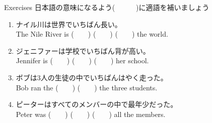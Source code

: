 \documentclass[aspectratio=169,xcolor={dvipsnames,table}]{beamer}
\begin{document}
 \begin{frame}[plain]{Exercises}
日本語の意味になるよう(~~~~~~)に適語を補いましょう%
\hfill{\scriptsize {}}
  \begin{enumerate}
   \item ナイル川は世界でいちばん長い。\\
	 The Nile River is (~~~~) (~~~~) (~~~~) the world.
   \item ジェニファーは学校でいちばん背が高い。\\
	 Jennifer is (~~~~) (~~~~) (~~~~) her school.
   \item ボブは3人の生徒の中でいちばんはやく走った。\\
	 Bob ran the (~~~~) (~~~~) the three students.
   \item ピーターはすべてのメンバーの中で最年少だった。\\
	 Peter was  (~~~~) (~~~~) (~~~~) all the members.
  \end{enumerate}
 \end{frame}
\end{document}

